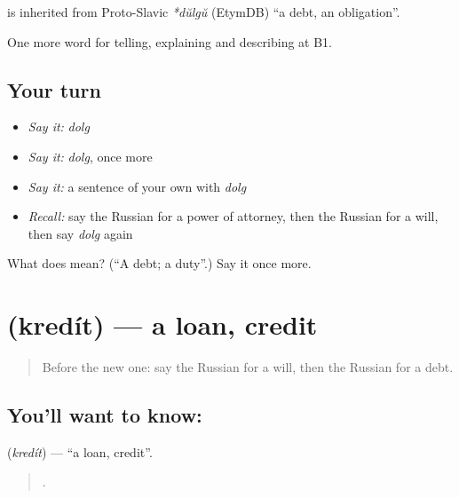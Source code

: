 \begin{cousinweb}
\textbf{} is inherited from Proto-Slavic \emph{*dŭlgŭ} (EtymDB) \textquotedblleft{}a debt, an obligation\textquotedblright{}.
\end{cousinweb}

\begin{grammarlens}[title={What you've built}]
One more word for telling, explaining and describing at B1.
\end{grammarlens}

\subsection*{Your turn}
\begin{itemize}
\raggedright
  \item \emph{Say it:} \emph{dolg}
  \item \emph{Say it:} \emph{dolg}, once more
  \item \emph{Say it:} a sentence of your own with \emph{dolg}
  \item \emph{Recall:} say the Russian for a power of attorney, then the Russian for a will, then say \emph{dolg} again
\end{itemize}

\begin{tcolorbox}[breakable,colback=teal!4,colframe=teal!35!black,title={Before you move on}]
What does  mean? (\textquotedblleft{}A debt; a duty\textquotedblright{}.) Say it once more.
\end{tcolorbox}
\section[\texorpdfstring{\ru{кредит} (kredít)}{кредит (kredít)}]{ (kredít) — a loan, credit}

\label{lesson:RU-C394-kredit}



\begin{quote}
Before the new one: say the Russian for a will, then the Russian for a debt.
\end{quote}

\subsection*{You'll want to know: }
\textbf{} (\emph{kredít}) — \textquotedblleft{}a loan, credit\textquotedblright{}.

\begin{quote}
    .
\end{quote}

